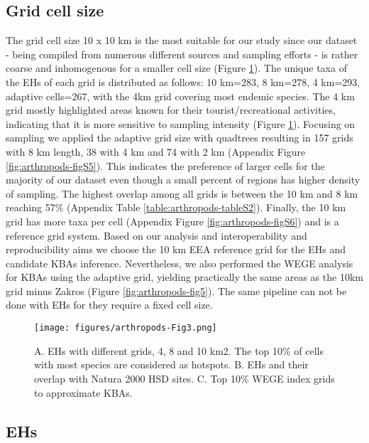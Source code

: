     \subsection{Grid cell size}
    \label{subsec:arthropods-grids}
The grid cell size 10 x 10 km is the most suitable for our study since our
dataset - being compiled from numerous different sources and sampling efforts -
is rather coarse and inhomogenous for a smaller cell size (Figure \ref{fig:arthropods-fig3}).
The unique taxa of the EHs of each grid is distributed as follows: 10 km=283,
8 km=278, 4 km=293, adaptive cells=267, with the 4km grid covering most endemic
species. The 4 km grid mostly highlighted areas known for their tourist/recreational activities,
indicating that it is more sensitive to sampling intensity (Figure \ref{fig:arthropods-fig3}).
Focusing on sampling we applied the adaptive grid size with quadtrees resulting
in 157 grids with 8 km length, 38 with 4 km and 74 with 2 km (Appendix Figure \ref{fig:arthropods-figS5}).
This indicates the preference of larger cells for the majority of our dataset
even though a small percent of regions has higher density of sampling.
The highest overlap among all grids is between the 10 km and 8 km reaching
57\% (Appendix Table \ref{table:arthropods-tableS2}). Finally, the 10 km grid has more taxa
per cell (Appendix Figure \ref{fig:arthropods-figS6}) and is a reference grid system.
Based on our analysis and interoperability and reproducibility aims we choose
the 10 km EEA reference grid for the EHs and candidate KBAs inference.
Nevertheless, we also performed the WEGE analysis for KBAs using the adaptive
grid, yielding practically the same areas as the 10km grid minus Zakros (Figure \ref{fig:arthropods-fig5}).
The same pipeline can not be done with EHs for they require a fixed cell size.

   \begin{figure}[ht]
      \centering
      \texttt{[image: figures/arthropods-Fig3.png]}
      \caption[Grids, hotspots and potential KBAs of Cretan endemic arthropods]{A. EHs with different grids, 4, 8 and 10 km2. The top 10\% of cells with most species are considered as hotspots. B. EHs and their overlap with Natura 2000 HSD sites. C. Top 10\% WEGE index grids to approximate KBAs.}
      \label{fig:arthropods-fig3}
   \end{figure}


    \subsection{EHs}
    \label{subsec:EHs}

